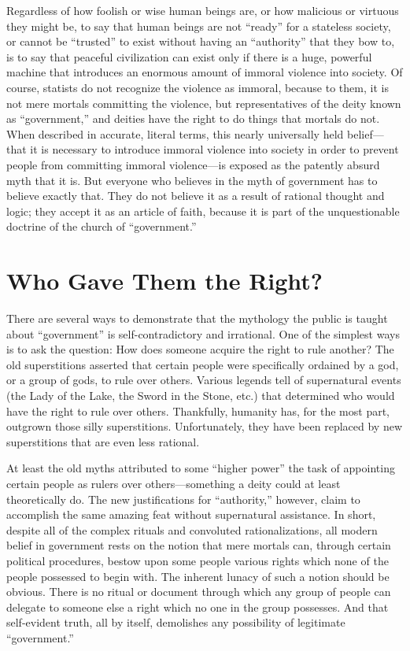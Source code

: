 \documentclass{book}
\begin{document}
Regardless of how foolish or wise human beings are, or how malicious or virtuous they might be, to say that human beings are not \enquote{ready} for a stateless society, or cannot be \enquote{trusted} to exist without having an \enquote{authority} that they bow to, is to say that peaceful civilization can exist only if there is a huge, powerful machine that introduces an enormous amount of immoral violence into society. Of course, statists do not recognize the violence as immoral, because to them, it is not mere mortals committing the violence, but representatives of the deity known as \enquote{government,} and deities have the right to do things that mortals do not. When described in accurate, literal terms, this nearly universally held belief---that it is necessary to introduce immoral violence into society in order to prevent people from committing immoral violence---is exposed as the patently absurd myth that it is. But everyone who believes in the myth of government has to believe exactly that. They do not believe it as a result of rational thought and logic; they accept it as an article of faith, because it is part of the unquestionable doctrine of the church of \enquote{government.}

\section{Who Gave Them the Right?}

There are several ways to demonstrate that the mythology the public is taught about \enquote{government} is self-contradictory and irrational. One of the simplest ways is to ask the question: How does someone acquire the right to rule another? The old superstitions asserted that certain people were specifically ordained by a god, or a group of gods, to rule over others. Various legends tell of supernatural events (the Lady of the Lake, the Sword in the Stone, etc.) that determined who would have the right to rule over others. Thankfully, humanity has, for the most part, outgrown those silly superstitions. Unfortunately, they have been replaced by new superstitions that are even less rational.

At least the old myths attributed to some \enquote{higher power} the task of appointing certain people as rulers over others---something a deity could at least theoretically do. The new justifications for \enquote{authority,} however, claim to accomplish the same amazing feat without supernatural assistance. In short, despite all of the complex rituals and convoluted rationalizations, all modern belief in government rests on the notion that mere mortals can, through certain political procedures, bestow upon some people various rights which none of the people possessed to begin with. The inherent lunacy of such a notion should be obvious. There is no ritual or document through which any group of people can delegate to someone else a right which no one in the group possesses. And that self-evident truth, all by itself, demolishes any possibility of legitimate \enquote{government.}
\end{document}
